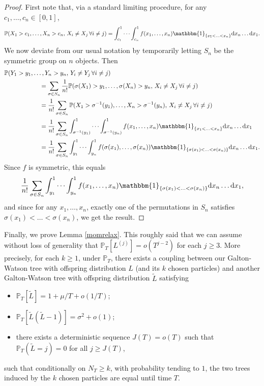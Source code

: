 \documentclass{article}
\theoremstyle{plain}
\theoremstyle{definition}
\renewcommand{\P}{\mathbb{P}}
\newcommand{\ind}{\mathbbm{1}}
\renewcommand{\d}{{\rm{d}}}
\begin{document}
\begin{proof}
First note that, via a standard limiting procedure, for any $c_1,\ldots,c_n\in[0,1]$,
\[\P(X_1>c_1,\ldots, X_n>c_n, \, X_i\neq X_j\,\forall i\neq j) = \int_{c_1}^1\cdots\int_{c_n}^1 f(x_1,\ldots,x_n)\ind_{\{x_1<\ldots<x_n\}} \d x_n\ldots\d x_1.\]
We now deviate from our usual notation by temporarily letting $S_n$ be the symmetric group on $n$ objects. Then
\begin{align*}
&\P(Y_1 > y_1,\ldots,Y_n>y_n,\, Y_i\neq Y_j \,\forall i\neq j)\\
&\hspace{20mm}= \sum_{\sigma\in S_n} \frac{1}{n!} \P(\sigma(X_1)>y_1,\ldots, \sigma(X_n)>y_n, \, X_i\neq X_j\,\forall i\neq j)\\
&\hspace{20mm}= \frac{1}{n!} \sum_{\sigma\in S_n} \P(X_1>\sigma^{-1}(y_1),\ldots, X_n>\sigma^{-1}(y_n), \, X_i\neq X_j\,\forall i\neq j)\\
&\hspace{20mm}= \frac{1}{n!} \sum_{\sigma\in S_n} \int_{\sigma^{-1}(y_1)}^1 \cdots \int_{\sigma^{-1}(y_n)}^1 f(x_1,\ldots,x_n) \ind_{\{x_1<\ldots<x_n\}} \d x_n\ldots\d x_1\\
&\hspace{20mm}= \frac{1}{n!} \sum_{\sigma\in S_n} \int_{y_1}^1 \cdots \int_{y_n}^1 f(\sigma(x_1),\ldots,\sigma(x_n)) \ind_{\{\sigma(x_1)<\ldots<\sigma(x_n)\}} \d x_n\ldots\d x_1.
\end{align*}
Since $f$ is symmetric, this equals
\[\frac{1}{n!} \sum_{\sigma\in S_n} \int_{y_1}^1 \cdots \int_{y_n}^1 f(x_1,\ldots,x_n) \ind_{\{\sigma(x_1)<\ldots<\sigma(x_n)\}} \d x_n\ldots\d x_1,\]
and since for any $x_1,\ldots,x_n$, exactly one of the permutations in $S_n$ satisfies $\sigma(x_1)<\ldots<\sigma(x_n)$, we get the result.
\end{proof}


Finally, we prove Lemma \ref{momrelax}. This roughly said that we can assume without loss of generality that $\P_T[L^{(j)}] = o(T^{j-2})$ for each $j\ge 3$. More precisely, for each $k\ge 1$, under $\P_T$, there exists a coupling between our Galton-Watson tree with offspring distribution $L$ (and its $k$ chosen particles) and another Galton-Watson tree with offspring distribution $\tilde L$ satisfying
\begin{itemize}
\item $\P_T[\tilde L] = 1+\mu/T + o(1/T)$;
\item $\P_T[\tilde L(\tilde L-1)] = \sigma^2 + o(1)$;
\item there exists a deterministic sequence $J(T)=o(T)$ such that $\P_T(\tilde L = j) = 0$ for all $j\ge J(T)$,
\end{itemize}
such that conditionally on $N_T\ge k$, with probability tending to $1$, the two trees induced by the $k$ chosen particles are equal until time $T$.
\end{document}
